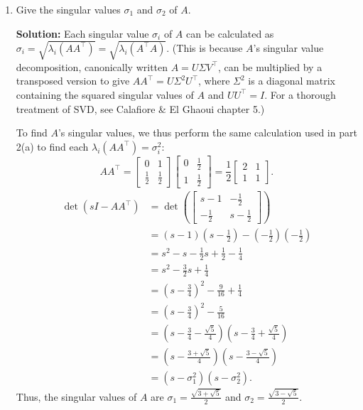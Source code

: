 \documentclass[10pt]{article}
\theoremstyle{definition}
\theoremstyle{plain}
\begin{document}
\begin{enumerate}[label=(\alph*)]
\item Give the singular values $\sigma_1$ and $\sigma_2$ of $A$.

\textbf{Solution:} Each singular value $\sigma_i$ of $A$ can be calculated as $\sigma_i = \sqrt{\lambda_i(AA^\top)} = \sqrt{\lambda_i(A^\top A)}$. (This is because $A$'s singular value decomposition, canonically written $A = U\Sigma V^\top$, can be multiplied by a transposed version to give $AA^\top = U\Sigma^2 U^\top$, where $\Sigma^2$ is a diagonal matrix containing the squared singular values of $A$ and $UU^\top = I$. For a thorough treatment of SVD, see Calafiore \& El Ghaoui chapter 5.)

To find $A$'s singular values, we thus perform the same calculation used in part 2(a) to find each $\lambda_i(AA^\top) = \sigma_i^2$:
\begin{equation}
AA^\top = \begin{bmatrix} 0 & 1 \\ \frac{1}{2} & \frac{1}{2} \end{bmatrix} \begin{bmatrix} 0 & \frac{1}{2} \\ 1 & \frac{1}{2} \end{bmatrix} = \frac{1}{2} \begin{bmatrix} 2 & 1 \\ 1 & 1 \end{bmatrix}.
\end{equation}
\begin{align}
\det\left(sI - AA^\top\right) &= \det\left( \begin{bmatrix} s - 1 & -\frac{1}{2} \\ -\frac{1}{2} & s - \frac{1}{2} \end{bmatrix} \right) \\
&= (s-1)\left(s - \frac{1}{2}\right) - \left(-\frac{1}{2}\right)\left(-\frac{1}{2}\right) \\
&= s^2 - s - \frac{1}{2}s + \frac{1}{2} - \frac{1}{4} \\
&= s^2 - \frac{3}{2}s + \frac{1}{4} \\
&= \left(s - \frac{3}{4}\right)^2 - \frac{9}{16} + \frac{1}{4} \\
&= \left(s - \frac{3}{4}\right)^2 - \frac{5}{16} \\
&= \left(s - \frac{3}{4} - \frac{\sqrt{5}}{4}\right)\left(s - \frac{3}{4} + \frac{\sqrt{5}}{4}\right) \\
&= \left(s - \frac{3 + \sqrt{5}}{4}\right)\left(s - \frac{3 - \sqrt{5}}{4}\right) \\
&= (s - \sigma_1^2)(s - \sigma_2^2).
\end{align}
Thus, the singular values of $A$ are $\sigma_1 = \frac{\sqrt{3+\sqrt{5}}}{2}$ and $\sigma_2 = \frac{\sqrt{3-\sqrt{5}}}{2}$.
\end{enumerate}
\end{document}
